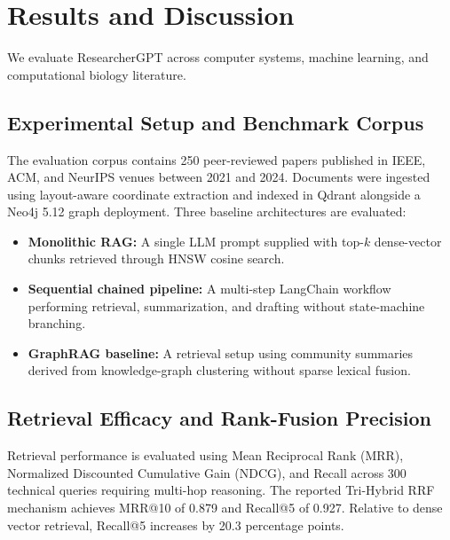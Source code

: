\documentclass[conference]{IEEEtran}
\begin{document}
\section{Results and Discussion}
We evaluate ResearcherGPT across computer systems, machine learning, and computational biology literature.

\subsection{Experimental Setup and Benchmark Corpus}
The evaluation corpus contains 250 peer-reviewed papers published in IEEE, ACM, and NeurIPS venues between 2021 and 2024. Documents were ingested using layout-aware coordinate extraction and indexed in Qdrant alongside a Neo4j 5.12 graph deployment. Three baseline architectures are evaluated:
\begin{itemize}
\item \textbf{Monolithic RAG:} A single LLM prompt supplied with top-$k$ dense-vector chunks retrieved through HNSW cosine search.
\item \textbf{Sequential chained pipeline:} A multi-step LangChain workflow performing retrieval, summarization, and drafting without state-machine branching.
\item \textbf{GraphRAG baseline:} A retrieval setup using community summaries derived from knowledge-graph clustering without sparse lexical fusion.
\end{itemize}

\subsection{Retrieval Efficacy and Rank-Fusion Precision}
Retrieval performance is evaluated using Mean Reciprocal Rank (MRR), Normalized Discounted Cumulative Gain (NDCG), and Recall across 300 technical queries requiring multi-hop reasoning. The reported Tri-Hybrid RRF mechanism achieves MRR@10 of 0.879 and Recall@5 of 0.927. Relative to dense vector retrieval, Recall@5 increases by 20.3 percentage points.
\end{document}
